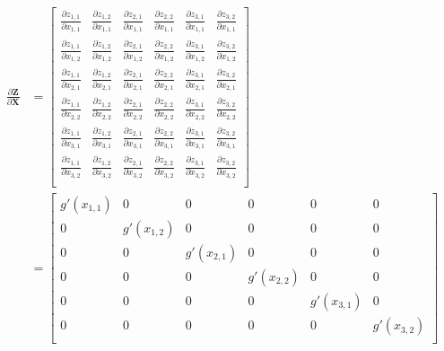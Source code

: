 \documentclass{article}
\newcommand{\matr}[1]{\mathbf{#1}} %
\begin{document}
\begin{align}
\frac{\partial \matr{Z}}{\partial \matr{X}} &=
\begin{bmatrix}
\frac{\partial z_{1,1}}{\partial x_{1,1}} & \frac{\partial z_{1,2}}{\partial x_{1,1}} & \frac{\partial z_{2,1}}{\partial x_{1,1}} & \frac{\partial z_{2,2}}{\partial x_{1,1}} & \frac{\partial z_{3,1}}{\partial x_{1,1}} & \frac{\partial z_{3,2}}{\partial x_{1,1}}\\[0.7em]
\frac{\partial z_{1,1}}{\partial x_{1,2}} & \frac{\partial z_{1,2}}{\partial x_{1,2}} & \frac{\partial z_{2,1}}{\partial x_{1,2}} & \frac{\partial z_{2,2}}{\partial x_{1,2}} & \frac{\partial z_{3,1}}{\partial x_{1,2}} & \frac{\partial z_{3,2}}{\partial x_{1,2}}\\[0.7em]
\frac{\partial z_{1,1}}{\partial x_{2,1}} & \frac{\partial z_{1,2}}{\partial x_{2,1}} & \frac{\partial z_{2,1}}{\partial x_{2,1}} & \frac{\partial z_{2,2}}{\partial x_{2,1}} & \frac{\partial z_{3,1}}{\partial x_{2,1}} & \frac{\partial z_{3,2}}{\partial x_{2,1}}\\[0.7em]
\frac{\partial z_{1,1}}{\partial x_{2,2}} & \frac{\partial z_{1,2}}{\partial x_{2,2}} & \frac{\partial z_{2,1}}{\partial x_{2,2}} & \frac{\partial z_{2,2}}{\partial x_{2,2}} & \frac{\partial z_{3,1}}{\partial x_{2,2}} & \frac{\partial z_{3,2}}{\partial x_{2,2}}\\[0.7em]
\frac{\partial z_{1,1}}{\partial x_{3,1}} & \frac{\partial z_{1,2}}{\partial x_{3,1}} & \frac{\partial z_{2,1}}{\partial x_{3,1}} & \frac{\partial z_{2,2}}{\partial x_{3,1}} & \frac{\partial z_{3,1}}{\partial x_{3,1}} & \frac{\partial z_{3,2}}{\partial x_{3,1}}\\[0.7em]
\frac{\partial z_{1,1}}{\partial x_{3,2}} & \frac{\partial z_{1,2}}{\partial x_{3,2}} & \frac{\partial z_{2,1}}{\partial x_{3,2}} & \frac{\partial z_{2,2}}{\partial x_{3,2}} & \frac{\partial z_{3,1}}{\partial x_{3,2}} & \frac{\partial z_{3,2}}{\partial x_{3,2}}\\[0.7em]
\end{bmatrix} \nonumber
\\ \label{dZbydX_elewise_single_matrix}
&=
\begin{bmatrix}
g'(x_{1,1}) & 0 & 0 & 0 & 0 & 0 \\[0.5em]
0 & g'(x_{1,2}) & 0 & 0 & 0 & 0 \\[0.5em]
0 & 0 & g'(x_{2,1}) & 0 & 0 & 0 \\[0.5em]
0 & 0 & 0 & g'(x_{2,2}) & 0 & 0 \\[0.5em]
0 & 0 & 0 & 0 & g'(x_{3,1}) & 0 \\[0.5em]
0 & 0 & 0 & 0 & 0 & g'(x_{3,2}) \\[0.5em]
\end{bmatrix}
\end{align}
\end{document}
